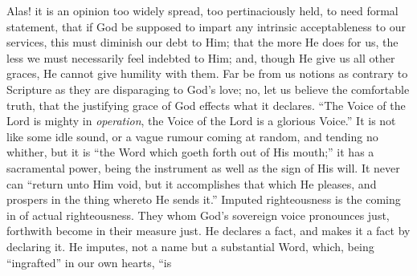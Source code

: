 Alas! it is an opinion too widely spread, too pertinaciously held,
to need formal statement, that if God be supposed to impart any
intrinsic acceptableness to our services, this must diminish our debt
to Him; that the more He does for us, the less we must necessarily
feel indebted to Him; and, though He give us all other graces, He
cannot give humility with them. Far be from us notions as contrary to
Scripture as they are disparaging to God's love; no, let us believe
the comfortable truth, that the justifying grace of God effects what
it declares. ``The Voice of the Lord is mighty in \emph{operation},
the Voice of the Lord is a glorious Voice.'' It is not like some
idle sound, or a vague rumour coming at random, and tending no
whither, but it is ``the Word which goeth forth out of His
mouth;'' it has a sacramental power, being the instrument as well
as the sign of His will. It never can ``return unto Him void, but
it accomplishes that which He pleases, and prospers in the thing
whereto He sends it.'' Imputed righteousness is the coming in of
actual righteousness. They whom God's sovereign voice pronounces just,
forthwith become in their measure just. He declares a fact, and makes
it a fact by declaring it. He imputes, not a name but a substantial
Word, which, being ``ingrafted'' in our own hearts, ``is
